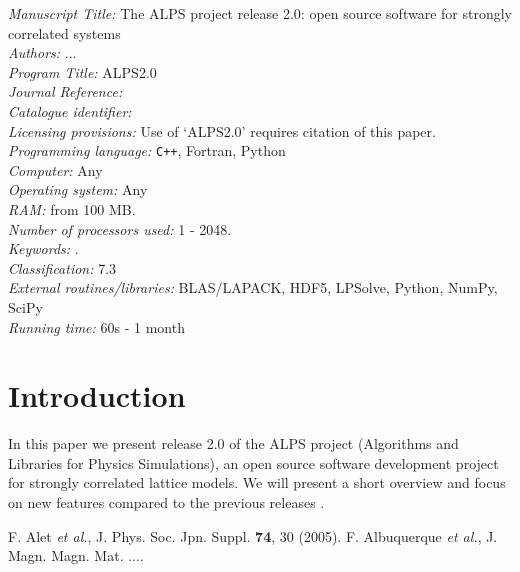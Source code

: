 \documentclass[3p,twocolumn]{elsarticle}
\begin{document}
\begin{small}
\noindent
{\em Manuscript Title:} The ALPS project release 2.0:  open source software for strongly correlated systems \\ 
{\em Authors:} ... \\ 
{\em Program Title:} ALPS2.0  \\
{\em Journal Reference:}                                      \\
{\em Catalogue identifier:}                                   \\
{\em Licensing provisions:} Use of `ALPS2.0' requires citation of this paper.\\
{\em Programming language:} \verb*#C++#, Fortran, Python \\
{\em Computer:} Any \\ 
{\em Operating system:} Any\\ 
{\em RAM:} from 100 MB.\\ 
{\em Number of processors used:} 1 - 2048.\\ 
{\em Keywords:} .\\ 
{\em Classification:} 7.3 \\ 
{\em External routines/libraries:}  BLAS/LAPACK, HDF5, LPSolve, Python, NumPy, SciPy\\ 
{\em Running time:} 60s - 1  month\\
\end{small}

\section{Introduction}
\label{}

In this paper we present release 2.0 of the ALPS project  (Algorithms and Libraries for Physics Simulations), an open source software development project for strongly correlated lattice models. We will present a short overview  and focus on new features compared to the previous releases \cite{ALPS1.2,ALPS1.3}.

\begin{thebibliography}{99} 
 F. Alet {\it et al.},  J. Phys. Soc. Jpn. Suppl. {\bf 74}, 30 (2005).
 F. Albuquerque {\it et al.}, J. Magn. Magn. Mat. ....


\end{thebibliography}
\end{document}
